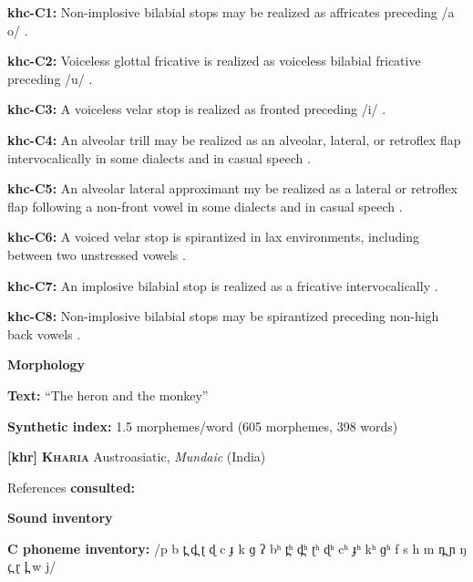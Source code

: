 \textbf{khc-C1:} Non-implosive bilabial stops may be realized as affricates preceding /a o/ \citep[16]{Donohue1999}.



\textbf{khc-C2:} Voiceless glottal fricative is realized as voiceless bilabial fricative preceding /u/ \citep[19]{Donohue1999}.



\textbf{khc-C3:} A voiceless velar stop is realized as fronted preceding /i/ \citep[19]{Donohue1999}.



\textbf{khc-C4:} An alveolar trill may be realized as an alveolar, lateral, or retroflex flap intervocalically in some dialects and in casual speech \citep[18]{Donohue1999}.



\textbf{khc-C5:} An alveolar lateral approximant my be realized as a lateral or retroflex flap following a non-front vowel in some dialects and in casual speech \citep[18]{Donohue1999}.



\textbf{khc-C6:} A voiced velar stop is spirantized in lax environments, including between two unstressed vowels \citep[27]{Donohue1999}.



\textbf{khc-C7:} An implosive bilabial stop is realized as a fricative intervocalically \citep[16]{Donohue1999}.



\textbf{khc-C8:} Non-implosive bilabial stops may be spirantized preceding non-high back vowels \citep[16]{Donohue1999}.



\textbf{Morphology}



\textbf{Text:} “The heron and the monkey” \citep[516-520]{Donohue1999}



\textbf{Synthetic index:} 1.5 morphemes/word (605 morphemes, 398 words)



\textbf{[khr]}   \textbf{\textsc{Kharia}}    Austroasiatic, \textit{Mundaic} (India)



References \textbf{consulted:} \citet{Peterson2011}



\textbf{Sound inventory}



\textbf{C phoneme inventory:} /p b t̪ d̪ ʈ ɖ c ɟ k ɡ ʔ bʰ t̪ʰ d̪ʰ ʈʰ ɖʰ cʰ ɟʰ kʰ ɡʰ f s h m n̪ ɲ ŋ ɾ̪ ɽ l̪ w j/



